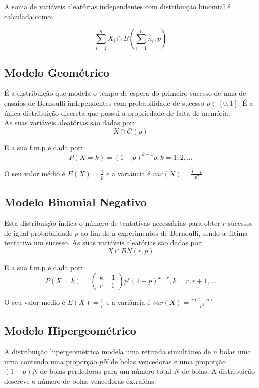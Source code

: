 \documentclass[10pt,a4paper]{report}
\begin{document}
\vspace{0.7cm}

A soma de variáveis aleatórias independentes com distribuiç\~ao binomial  é calculada como:

$$
\sum_{i=1}^{n} X_i \cap B\left(\sum_{i=1}^{n} n_i, p\right)
$$

\subsection{Modelo Geométrico}
É a distribuição que modela o tempo de espera do primeiro sucesso de uma de ensaios de Bernoulli independentes com probabilidade de sucesso $ p\in [0,1]$. É a única distribuição discreta que possui a propriedade de falta de memória.\\
As suas variáveis aleatórias s\~ao dadas por:\\

$$
X \cap G(p)
$$

E a sua f.m.p é dada por:\\

$$
P(X = k) = (1-p)^{k-1}p, k = 1, 2,...
$$

\vspace{0.7cm}

O seu valor médio é $E(X)=\frac{1}{p}$ e a variância é $var(X)=\frac{1-p}{p^2}$


\subsection{Modelo Binomial Negativo}
Esta distribuição indica o número de tentativas necessárias para obter $r$ sucessos de igual probabilidade $p$ ao fim de n experimentos de Bernoulli, sendo a última tentativa um sucesso.
As suas variáveis aleatórias s\~ao dadas por:\\

$$
X \cap BN(r, p)
$$

E a sua f.m.p é dada por:\\

$$
P(X = k) = \begin{pmatrix}
k-1 \\
r-1
\end{pmatrix} p^r(1-p)^{k-r}, k = r, r+1, ...
$$

\vspace{0.7cm}

O seu valor médio é $E(X)=\frac{r}{p}$ e a variância é $var(X)=\frac{r(1-p)}{p^2}$

\subsection{Modelo Hipergeométrico}
A distribuição hipergeométrica modela uma retirada simultânea de $n$ bolas uma urna contendo uma proporção $pN$ de bolas vencedoras e uma proporção $(1-p)N$ de bolas perdedoras para um número total $N$ de bolas. A distribuição descreve o número de bolas vencedoras extraídas.
\end{document}
